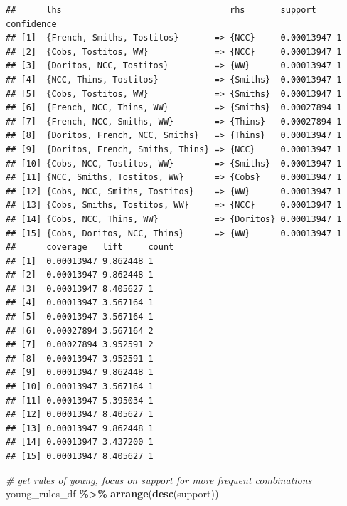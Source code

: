 \documentclass[
]{article}
\newenvironment{Shaded}{\begin{snugshade}}{\end{snugshade}}
\newcommand{\CommentTok}[1]{\textcolor[rgb]{0.56,0.35,0.01}{\textit{#1}}}
\newcommand{\FunctionTok}[1]{\textcolor[rgb]{0.13,0.29,0.53}{\textbf{#1}}}
\newcommand{\NormalTok}[1]{#1}
\newcommand{\SpecialCharTok}[1]{\textcolor[rgb]{0.81,0.36,0.00}{\textbf{#1}}}
\begin{document}
\begin{verbatim}
##      lhs                                 rhs       support    confidence
## [1]  {French, Smiths, Tostitos}       => {NCC}     0.00013947 1         
## [2]  {Cobs, Tostitos, WW}             => {NCC}     0.00013947 1         
## [3]  {Doritos, NCC, Tostitos}         => {WW}      0.00013947 1         
## [4]  {NCC, Thins, Tostitos}           => {Smiths}  0.00013947 1         
## [5]  {Cobs, Tostitos, WW}             => {Smiths}  0.00013947 1         
## [6]  {French, NCC, Thins, WW}         => {Smiths}  0.00027894 1         
## [7]  {French, NCC, Smiths, WW}        => {Thins}   0.00027894 1         
## [8]  {Doritos, French, NCC, Smiths}   => {Thins}   0.00013947 1         
## [9]  {Doritos, French, Smiths, Thins} => {NCC}     0.00013947 1         
## [10] {Cobs, NCC, Tostitos, WW}        => {Smiths}  0.00013947 1         
## [11] {NCC, Smiths, Tostitos, WW}      => {Cobs}    0.00013947 1         
## [12] {Cobs, NCC, Smiths, Tostitos}    => {WW}      0.00013947 1         
## [13] {Cobs, Smiths, Tostitos, WW}     => {NCC}     0.00013947 1         
## [14] {Cobs, NCC, Thins, WW}           => {Doritos} 0.00013947 1         
## [15] {Cobs, Doritos, NCC, Thins}      => {WW}      0.00013947 1         
##      coverage   lift     count
## [1]  0.00013947 9.862448 1    
## [2]  0.00013947 9.862448 1    
## [3]  0.00013947 8.405627 1    
## [4]  0.00013947 3.567164 1    
## [5]  0.00013947 3.567164 1    
## [6]  0.00027894 3.567164 2    
## [7]  0.00027894 3.952591 2    
## [8]  0.00013947 3.952591 1    
## [9]  0.00013947 9.862448 1    
## [10] 0.00013947 3.567164 1    
## [11] 0.00013947 5.395034 1    
## [12] 0.00013947 8.405627 1    
## [13] 0.00013947 9.862448 1    
## [14] 0.00013947 3.437200 1    
## [15] 0.00013947 8.405627 1
\end{verbatim}

\begin{Shaded}
\begin{Highlighting}[]
\CommentTok{\# get rules of young, focus on support for more frequent combinations}
\NormalTok{young\_rules\_df }\SpecialCharTok{\%\textgreater{}\%} \FunctionTok{arrange}\NormalTok{(}\FunctionTok{desc}\NormalTok{(support))}
\end{Highlighting}
\end{Shaded}
\end{document}
